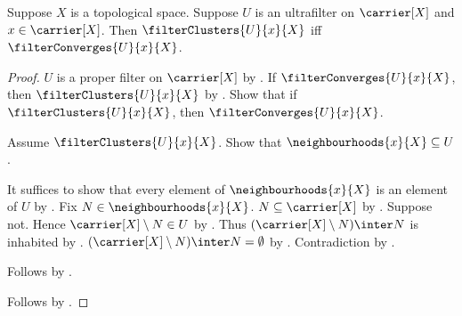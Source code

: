 \begin{theorem}\label{ultrafilter_cluster_iff_converges}
    Suppose $X$ is a topological space.
    Suppose $U$ is an ultrafilter on $\carrier[X]$ and
        $x\in\carrier[X]$.
    Then $\filterClusters{U}{x}{X}$ iff
        $\filterConverges{U}{x}{X}$.
\end{theorem}
\begin{proof}
    $U$ is a proper filter on $\carrier[X]$
        by .
    If $\filterConverges{U}{x}{X}$, then
        $\filterClusters{U}{x}{X}$
        by .
    Show that if $\filterClusters{U}{x}{X}$, then
        $\filterConverges{U}{x}{X}$.
    \begin{subproof}
        Assume $\filterClusters{U}{x}{X}$.
        Show that $\neighbourhoods{x}{X}\subseteq U$.
        \begin{subproof}
            It suffices to show that every element of
                $\neighbourhoods{x}{X}$ is an element of $U$
                by .
            Fix $N\in\neighbourhoods{x}{X}$.
            $N\subseteq\carrier[X]$
                by .
            Suppose not.
            Hence $\carrier[X]\setminus N\in U$
                by .
            Thus $(\carrier[X]\setminus N)\inter N$ is inhabited
                by .
            $(\carrier[X]\setminus N)\inter N=\emptyset$
                by .
            Contradiction by .
        \end{subproof}
        Follows by .
    \end{subproof}
    Follows by \auto.
\end{proof}

